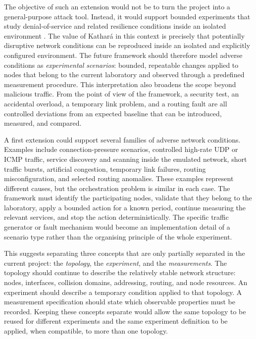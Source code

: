 The objective of such an extension would not be to turn the project into a
general-purpose attack tool. Instead, it would support bounded experiments that
study denial-of-service and related resilience conditions inside an isolated
environment \cite{rfc4732}. The value of Kathar\'a in this context is precisely
that potentially disruptive network conditions can be reproduced inside an
isolated and explicitly configured environment. The future framework should
therefore model adverse conditions as \emph{experimental scenarios}: bounded,
repeatable changes applied to nodes that belong to the current laboratory and
observed through a predefined measurement procedure. This interpretation also
broadens the scope beyond malicious traffic. From the point of view of the
framework, a security test, an accidental overload, a temporary link problem,
and a routing fault are all controlled deviations from an expected baseline
that can be introduced, measured, and compared.

A first extension could support several families of adverse network conditions.
Examples include connection-pressure scenarios, controlled high-rate UDP or
ICMP traffic, service discovery and scanning inside the emulated network,
short traffic bursts, artificial congestion, temporary link failures, routing
misconfiguration, and selected routing anomalies. These examples represent
different causes, but the orchestration problem is similar in each case. The
framework must identify the participating nodes, validate that they belong to
the laboratory, apply a bounded action for a known period, continue measuring
the relevant services, and stop the action deterministically. The specific
traffic generator or fault mechanism would become an implementation detail of
a scenario type rather than the organising principle of the whole experiment.

This suggests separating three concepts that are only partially separated in
the current project: the \emph{topology}, the \emph{experiment}, and the
\emph{measurements}. The topology should continue to describe the relatively
stable network structure: nodes, interfaces, collision domains, addressing,
routing, and node resources. An experiment should describe a temporary
condition applied to that topology. A measurement specification should state
which observable properties must be recorded. Keeping these concepts separate
would allow the same topology to be reused for different experiments and the
same experiment definition to be applied, when compatible, to more than one
topology.

